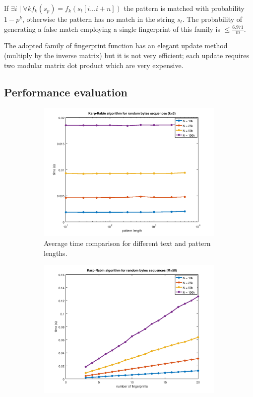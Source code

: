 \documentclass{article}
\begin{document}
If $\exists i \mid \forall k f_k(s_p) = f_k(s_t[i ... i + n])$ the pattern is matched with probability $1 - p^k$, otherwise the pattern has no match in the string $s_t$. The probability of generating a false match employing a single fingerprint of this family is $\le \frac{6.971}{m}$.

The adopted family of fingerprint function has an elegant update method (multiply by the inverse matrix) but it is not very efficient; each update requires two modular matrix dot product which are very expensive.

\subsection{Performance evaluation}

\begin{figure}
  \centering
  \begin{subfigure}[b]{0.4\linewidth}
    \includegraphics[width=\linewidth]{karp1.png}
     \caption{Average time comparison for different text and pattern lengths.}
  \end{subfigure}
  \begin{subfigure}[b]{0.4\linewidth}
    \includegraphics[width=\linewidth]{karp2.png}

\end{subfigure}
\end{figure}
\end{document}
